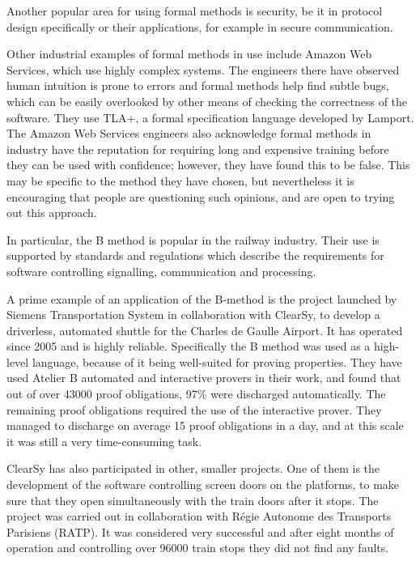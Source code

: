 \documentclass[12pt,journal,duplex]{IEEEtran}
\begin{document}
	Another popular area for using formal methods is security, be it in protocol design specifically\cite{security} or their applications, for example in secure communication\cite{security2}.

	Other industrial examples of formal methods in use include Amazon Web Services, which use highly complex systems\cite{amazon}. The engineers there have observed human intuition is prone to errors and formal methods help find subtle bugs, which can be easily overlooked by other means of checking the correctness of the software. They use TLA+, a formal specification language developed by Lamport\cite{TLA}. The Amazon Web Services engineers also acknowledge formal methods in industry have the reputation for requiring long and expensive training before they can be used with confidence; however, they have found this to be false. This may be specific to the method they have chosen, but nevertheless it is encouraging that people are questioning such opinions, and are open to trying out this approach.

	In particular, the B method is popular in the railway industry. Their use is supported by standards and regulations which describe the requirements for software controlling signalling, communication and processing\cite{railway standard}.

	A prime example of an application of the B-method is the project launched by Siemens Transportation System in collaboration with ClearSy, to develop a driverless, automated shuttle for the Charles de Gaulle Airport\cite{airport shuttle}. It has operated since 2005 and is highly reliable. Specifically the B method was used as a high-level language, because of it being well-suited for proving properties. They have used Atelier B automated and interactive provers in their work, and found that out of over 43000 proof obligations, 97\% were discharged automatically. The remaining proof obligations required the use of the interactive prover. They managed to discharge on average 15 proof obligations in a day, and at this scale it was still a very time-consuming task.

	ClearSy has also participated in other, smaller projects. One of them is the development of the software controlling screen doors on the platforms, to make sure that they open simultaneously with the train doors after it stops. The project was carried out in collaboration with R\'{e}gie Autonome des Transports Parisiens (RATP). It was considered very successful and after eight months of operation and controlling over 96000 train stops they did not find any faults\cite{screen doors}.
\end{document}

